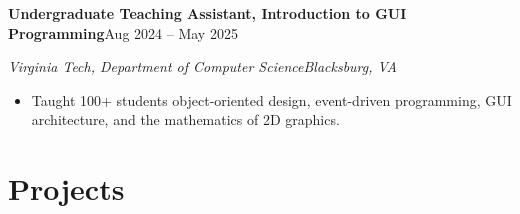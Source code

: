 \documentclass[letterpaper,9pt]{extarticle}
\newcommand{\entry}[2]{%
  \textbf{#1}\hfill#2\par}
\newcommand{\subentry}[2]{%
  \textit{#1}\hfill\textit{#2}\par\vspace{0.2ex}}
\begin{document}
\vspace{0.6ex}
\entry{Undergraduate Teaching Assistant, Introduction to GUI Programming}{Aug 2024 -- May 2025}
\subentry{Virginia Tech, Department of Computer Science}{Blacksburg, VA}
\begin{itemize}
  \item Taught 100+ students object-oriented design, event-driven programming, GUI architecture, and the mathematics of 2D graphics.
\end{itemize}

\section{Projects}
\end{document}
